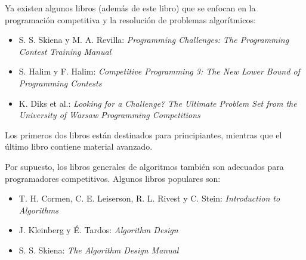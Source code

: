 Ya existen algunos libros (además de este libro) que
se enfocan en la programación competitiva y la resolución de problemas algorítmicos:

\begin{itemize}
\item S. S. Skiena y M. A. Revilla:
\emph{Programming Challenges: The Programming Contest Training Manual} \cite{ski03}
\item S. Halim y F. Halim:
\emph{Competitive Programming 3: The New Lower Bound of Programming Contests} \cite{hal13}
\item K. Diks et al.: \emph{Looking for a Challenge? The Ultimate Problem Set from
the University of Warsaw Programming Competitions} \cite{dik12}
\end{itemize}

Los primeros dos libros están destinados para principiantes,
mientras que el último libro contiene material avanzado.

Por supuesto, los libros generales de algoritmos también son adecuados para
programadores competitivos.
Algunos libros populares son:

\begin{itemize}
\item T. H. Cormen, C. E. Leiserson, R. L. Rivest y C. Stein:
\emph{Introduction to Algorithms} \cite{cor09}
\item J. Kleinberg y É. Tardos:
\emph{Algorithm Design} \cite{kle05}
\item S. S. Skiena:
\emph{The Algorithm Design Manual} \cite{ski08}
\end{itemize}
